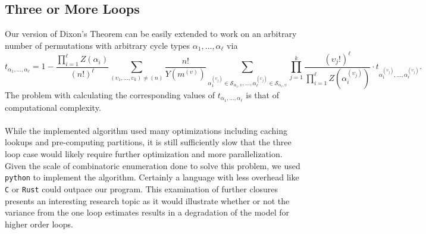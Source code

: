 \subsection{Three or More Loops}
Our version of Dixon's Theorem can be easily extended to work on an
arbitrary number of permutations with arbitrary cycle types
$\alpha_1,\dots,\alpha_\ell$ via
\[
  t_{\alpha_1, \dots, \alpha_\ell} = 1 - \frac{\prod_{i=1}^\ell
  Z(\alpha_i)}{(n!)^\ell} \sum_{(\upsilon_1,\dots,\upsilon_k)\ne(n)}
  \frac{n!}{Y(m^{(\upsilon)})} \sum_{\alpha_1^{(\upsilon_j)} \in
    \mathcal{S}_{\alpha_1, \upsilon},\dots,\alpha_\ell^{(\upsilon_j)}
  \in \mathcal{S}_{\alpha_\ell, \upsilon}} \prod_{j=1}^k
  \frac{(\upsilon_j!)^\ell}{\prod_{i=1}^\ell
  Z(\alpha_i^{(\upsilon_j)})} \cdot t_{\alpha_1^{(\upsilon_j)},
  \dots, \alpha_\ell^{(\upsilon_j)}}.
\]
The
problem with calculating the corresponding values of
$t_{\alpha_1,\dots,\alpha_\ell}$ is that of computational complexity.
\\\\While the implemented algorithm used many optimizations including
caching lookups and pre-computing partitions, it is still sufficiently
slow that the three loop case would likely require further
optimization and more parallelization. Given the scale of
combinatoric enumeration done to solve this problem, we used
\texttt{python} to implement the algorithm. Certainly a language with
less overhead like \texttt{C} or \texttt{Rust} could outpace our
program. This examination of further closures presents an interesting
research topic as it would illustrate whether or not the variance
from the one loop estimates results in a degradation of the model for
higher order loops.
